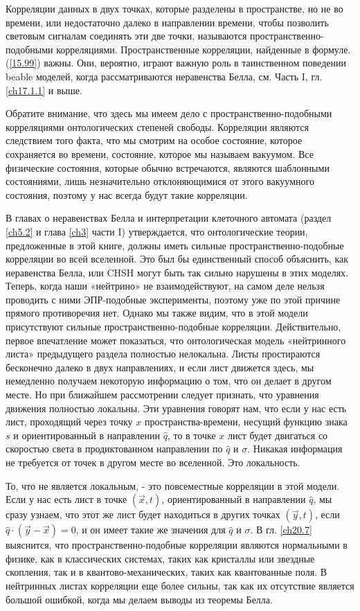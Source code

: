\documentclass[main.tex]{subfiles}
\begin{document}
Корреляции данных в двух точках, которые разделены в пространстве, но не во времени, или недостаточно далеко в направлении времени, чтобы позволить световым сигналам соединять эти две точки, называются пространственно-подобными корреляциями. Пространственные корреляции, найденные в формуле. (\ref{15.99}) важны. Они, вероятно, играют важную роль в таинственном поведении beable моделей, когда рассматриваются неравенства Белла, см. Часть I, гл. \ref{ch17.1.1} и выше.

Обратите внимание, что здесь мы имеем дело с пространственно-подобными корреляциями онтологических степеней свободы. Корреляции являются следствием того факта, что мы смотрим на особое состояние, которое сохраняется во времени, состояние, которое мы называем вакуумом. Все физические состояния, которые обычно встречаются, являются шаблонными состояниями, лишь незначительно отклоняющимися от этого вакуумного состояния, поэтому у нас всегда будут такие корреляции.

В главах о неравенствах Белла и интерпретации клеточного автомата (раздел \ref{ch5.2} и глава \ref{ch3} части I) утверждается, что онтологические теории, предложенные в этой книге, должны иметь сильные пространственно-подобные корреляции во всей вселенной. Это был бы единственный способ объяснить, как неравенства Белла, или CHSH могут быть так сильно нарушены в этих моделях. Теперь, когда наши «нейтрино» не взаимодействуют, на самом деле нельзя проводить с ними ЭПР-подобные эксперименты, поэтому уже по этой причине прямого противоречия нет. Однако мы также видим, что в этой модели присутствуют сильные пространственно-подобные корреляции.
Действительно, первое впечатление может показаться, что онтологическая модель «нейтринного листа» предыдущего раздела полностью нелокальна. Листы простираются бесконечно далеко в двух направлениях, и если лист движется здесь, мы немедленно получаем некоторую информацию о том, что он делает в другом месте. Но при ближайшем рассмотрении следует признать, что уравнения движения полностью локальны. Эти уравнения говорят нам, что если у нас есть лист, проходящий через точку $x$ пространства-времени, несущий функцию знака $s$ и ориентированный в направлении $\hat q$, то в точке $x$ лист будет двигаться со скоростью света в продиктованном направлении по $\hat q$ и $\sigma$. Никакая информация не требуется от точек в другом месте во вселенной. Это локальность.

То, что не является локальным, - это повсеместные корреляции в этой модели. Если у нас есть лист в точке $(\vec x, t)$, ориентированный в направлении $\hat q$, мы сразу узнаем, что этот же лист будет находиться в других точках $(\vec y, t)$, если $\hat q \cdot (\vec y - \vec x) = 0$, и он имеет такие же значения для $\hat q$ и $\sigma$. В гл. \ref{ch20.7} выяснится, что пространственно-подобные корреляции являются нормальными в физике, как в классических системах, таких как кристаллы или звездные скопления, так и в квантово-механических, таких как квантованные поля. В нейтринных листах корреляции еще более сильны, так как их отсутствие является большой ошибкой, когда мы делаем выводы из теоремы Белла.
\end{document}
